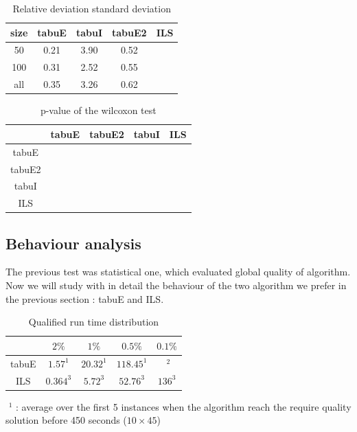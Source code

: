 \documentclass[12pt,a4paper]{article}
\begin{document}
\begin{table}[!h]
\centering
\begin{tabular}{|*{5}{c|}}
  \hline
  size & tabuE & tabuI & tabuE2 & ILS\\
  \hline
  50 & 0.21 & 3.90 & 0.52 &  \\ 
  100 & 0.31 & 2.52 & 0.55 &  \\
  all & 0.35 & 3.26 & 0.62 &  \\
  \hline
\end{tabular}
\caption{Relative deviation standard deviation}
\label{Relative deviation standard deviation}
\end{table}

\begin{table}[!h]
\centering
\begin{tabular}{|*{5}{c|}}
  \hline
  ~ & tabuE & tabuE2 & tabuI & ILS\\
  \hline
   tabuE &  &  &  &  \\ 
   tabuE2 &  &  &  &  \\
   tabuI &  &  &  &  \\
   ILS &  &  &  &  \\
  \hline
\end{tabular}
\caption{p-value of the wilcoxon test}
\label{p-value of the wilcoxon test}
\end{table}


\subsection{Behaviour analysis}

The previous test was statistical one, which evaluated global quality of algorithm. Now we will study with in detail the behaviour of the two algorithm we prefer in the previous section : tabuE and ILS.

\begin{table}[!h]
\centering
\begin{tabular}{|*{5}{c|}}
  \hline
  ~ & $2\%$ & $1\%$ & $0.5\%$ & $0.1\%$ \\
  \hline
   tabuE & $1.57^1$ & $20.32^1$ & $118.45^1$ & $\text{~}^2$ \\ 
   ILS & $0.364^3$ & $5.72^3$ & $52.76^3$ & $136^3$ \\
  \hline
\end{tabular}
\caption{Qualified run time distribution}
\label{Average qualified run time distribution}
\end{table}

$\text{~}^1$ : average over the first 5 instances when the algorithm reach the require quality solution before 450 seconds ($10 \times 45$)
\end{document}
